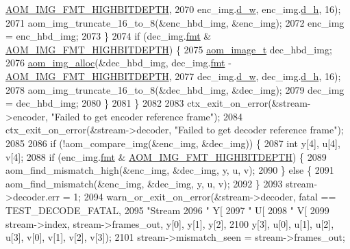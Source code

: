 \begin{DoxyCodeInclude}
{{{{{{{{{{{{{{{{{{{{{{{{{{{{{{{{{{{{{{{{{{{{{{{{{{{{{{{      \hyperlink{aom__image_8h_a607b37d91f75442f54223ecd85f1b6cb}{AOM\_IMG\_FMT\_HIGHBITDEPTH},
2070           enc\_img.\hyperlink{structaom__image_a89f80b1f58d608b9d2080635f4359034}{d\_w}, enc\_img.\hyperlink{structaom__image_ab986419a1f0fff93a2dc505f47194988}{d\_h}, 16);
2071       aom\_img\_truncate\_16\_to\_8(&enc\_hbd\_img, &enc\_img);
2072       enc\_img = enc\_hbd\_img;
2073     \}
2074     \textcolor{keywordflow}{if} (dec\_img.\hyperlink{structaom__image_a6c64b1ab918d80d52eb8f5d6d957e825}{fmt} & \hyperlink{aom__image_8h_a607b37d91f75442f54223ecd85f1b6cb}{AOM\_IMG\_FMT\_HIGHBITDEPTH}) \{
2075       \hyperlink{structaom__image}{aom\_image\_t} dec\_hbd\_img;
2076       \hyperlink{aom__image_8h_a570db29fbd122951235a08fe9375f6bb}{aom\_img\_alloc}(&dec\_hbd\_img, dec\_img.\hyperlink{structaom__image_a6c64b1ab918d80d52eb8f5d6d957e825}{fmt} - 
      \hyperlink{aom__image_8h_a607b37d91f75442f54223ecd85f1b6cb}{AOM\_IMG\_FMT\_HIGHBITDEPTH},
2077           dec\_img.\hyperlink{structaom__image_a89f80b1f58d608b9d2080635f4359034}{d\_w}, dec\_img.\hyperlink{structaom__image_ab986419a1f0fff93a2dc505f47194988}{d\_h}, 16);
2078       aom\_img\_truncate\_16\_to\_8(&dec\_hbd\_img, &dec\_img);
2079       dec\_img = dec\_hbd\_img;
2080     \}
2081   \}
2082 
2083   ctx\_exit\_on\_error(&stream->encoder, \textcolor{stringliteral}{"Failed to get encoder reference frame"});
2084   ctx\_exit\_on\_error(&stream->decoder, \textcolor{stringliteral}{"Failed to get decoder reference frame"});
2085 
2086   \textcolor{keywordflow}{if} (!aom\_compare\_img(&enc\_img, &dec\_img)) \{
2087     \textcolor{keywordtype}{int} y[4], u[4], v[4];
2088     \textcolor{keywordflow}{if} (enc\_img.\hyperlink{structaom__image_a6c64b1ab918d80d52eb8f5d6d957e825}{fmt} & \hyperlink{aom__image_8h_a607b37d91f75442f54223ecd85f1b6cb}{AOM\_IMG\_FMT\_HIGHBITDEPTH}) \{
2089       aom\_find\_mismatch\_high(&enc\_img, &dec\_img, y, u, v);
2090     \} \textcolor{keywordflow}{else} \{
2091       aom\_find\_mismatch(&enc\_img, &dec\_img, y, u, v);
2092     \}
2093     stream->decoder.err = 1;
2094     warn\_or\_exit\_on\_error(&stream->decoder, fatal == TEST\_DECODE\_FATAL,
2095         \textcolor{stringliteral}{"Stream %
2096         \textcolor{stringliteral}{" Y[%
2097         \textcolor{stringliteral}{" U[%
2098         \textcolor{stringliteral}{" V[%
2099         stream->index, stream->frames\_out, y[0], y[1], y[2],
2100         y[3], u[0], u[1], u[2], u[3], v[0], v[1], v[2], v[3]);
2101     stream->mismatch\_seen = stream->frames\_out;
}}}}}}}}}}}}}}}}}}}}}}}}}}}}}}}}}}}}}}}}}}}}}}}}}}}}}}}}}}}
\end{DoxyCodeInclude}
